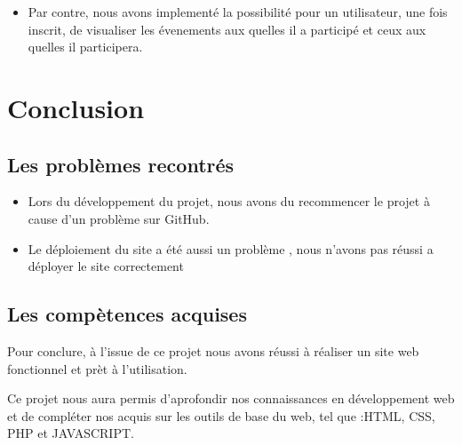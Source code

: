 \documentclass[oneside,11pt,a4paper]{article}
\begin{document}
\begin{itemize}
\item Par contre, nous avons implementé la possibilité pour un utilisateur, une fois inscrit, de visualiser les évenements aux quelles il a participé et ceux aux quelles il participera.

\end{itemize}
\section{Conclusion}

\subsection{Les problèmes recontrés}
\begin{itemize}
\item Lors du développement du projet, nous avons du recommencer le projet à cause d'un problème sur GitHub.
\item Le déploiement du site a été aussi un problème , nous n'avons pas réussi a déployer le site correctement
\end{itemize}


\subsection{Les compètences acquises}

Pour conclure, à l’issue de ce projet nous avons réussi à réaliser un site web fonctionnel et prèt à l'utilisation. 

Ce projet nous aura permis d’aprofondir nos connaissances en développement web et de compléter nos acquis sur les outils de base du web, tel que :HTML, CSS, PHP et JAVASCRIPT.
\end{document}

